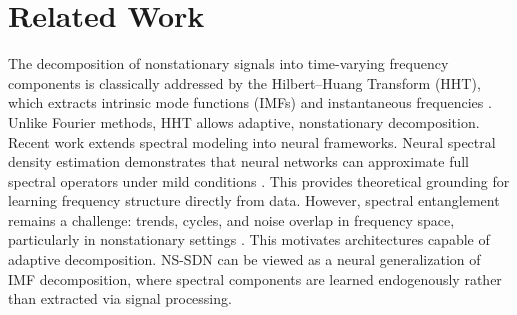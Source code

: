 \section{Related Work}
The decomposition of nonstationary signals into time-varying frequency components is classically addressed by the Hilbert--Huang Transform (HHT), which extracts intrinsic mode functions (IMFs) and instantaneous frequencies \cite{huang1998empirical}. Unlike Fourier methods, HHT allows adaptive, nonstationary decomposition.
Recent work extends spectral modeling into neural frameworks. Neural spectral density estimation demonstrates that neural networks can approximate full spectral operators under mild conditions \cite{mohammadi2026spectral}. This provides theoretical grounding for learning frequency structure directly from data.
However, spectral entanglement remains a challenge: trends, cycles, and noise overlap in frequency space, particularly in nonstationary settings \cite{an2026fredn}. This motivates architectures capable of adaptive decomposition.
NS-SDN can be viewed as a neural generalization of IMF decomposition, where spectral components are learned endogenously rather than extracted via signal processing.